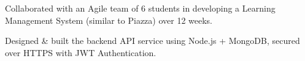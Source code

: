 \documentclass[]{constants}
\begin{document}
\begin{minipage}[t]{0.66\textwidth}
 \newline
{}
\begin{tightemize}
\item Collaborated with an Agile team of 6 students in developing a Learning Management System (similar to Piazza) over 12 weeks.
\item Designed \& built the backend API service using Node.js + MongoDB, secured over HTTPS with JWT Authentication.
\end{tightemize}
\sectionsep







\end{minipage}
\end{document}
